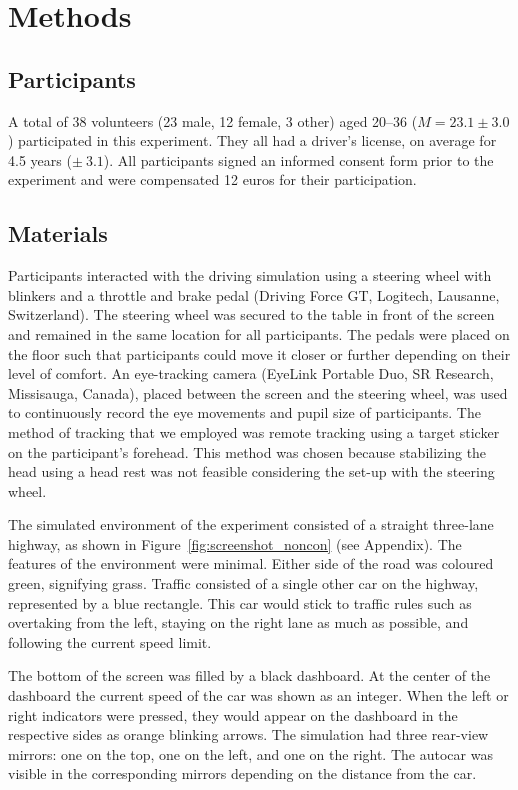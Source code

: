 
\section{Methods}\label{sec:methods}

\subsection{Participants}
A total of 38 volunteers (23 male, 12 female, 3 other) aged 20--36 (\(M = 23.1 \pm 3.0\)) participated in this experiment. 
They all had a driver's license, on average for 4.5 years (\(\pm\ 3.1\)).
All participants signed an informed consent form prior to the experiment and were compensated 12 euros for their participation.

\subsection{Materials}
Participants interacted with the driving simulation using a steering wheel with blinkers and a throttle and brake pedal (Driving Force GT, Logitech, Lausanne, Switzerland). 
The steering wheel was secured to the table in front of the screen and remained in the same location for all participants. 
The pedals were placed on the floor such that participants could move it closer or further depending on their level of comfort. 
An eye-tracking camera (EyeLink Portable Duo, SR Research, Missisauga, Canada), placed between the screen and the steering wheel, was used to continuously record the eye movements and pupil size of participants. 
The method of tracking that we employed was remote tracking using a target sticker on the participant's forehead.
This method was chosen because stabilizing the head using a head rest was not feasible considering the set-up with the steering wheel.

The simulated environment of the experiment consisted of a straight three-lane highway, as shown in Figure~\ref{fig:screenshot_noncon} (see Appendix).
The features of the environment were minimal. 
Either side of the road was coloured green, signifying grass. 
Traffic consisted of a single other car on the highway, represented by a blue rectangle.
This car would stick to traffic rules such as overtaking from the left, staying on the right lane as much as possible, and following the current speed limit. 

The bottom of the screen was filled by a black dashboard. 
At the center of the dashboard the current speed of the car was shown as an integer.
When the left or right indicators were pressed, they would appear on the dashboard in the respective sides as orange blinking arrows. 
The simulation had three rear-view mirrors: one on the top, one on the left, and one on the right. 
The autocar was visible in the corresponding mirrors depending on the distance from the car. 

